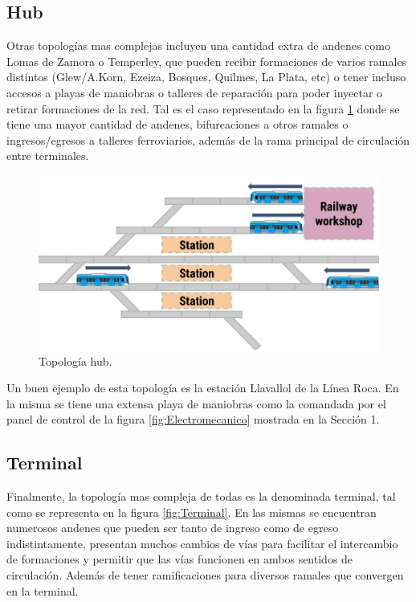 	\subsection{Hub}
	
		Otras topologías mas complejas incluyen una cantidad extra de andenes como Lomas de Zamora o Temperley, que pueden recibir formaciones de varios ramales distintos (Glew/A.Korn, Ezeiza, Bosques, Quilmes, La Plata, etc) o tener incluso accesos a playas de maniobras o talleres de reparación para poder inyectar o retirar formaciones de la red. Tal es el caso representado en la figura \ref{fig:Hub} donde se tiene una mayor cantidad de andenes, bifurcaciones a otros ramales o ingresos/egresos a talleres ferroviarios, además de la rama principal de circulación entre terminales. 
		
			\begin{figure}[h]
			\centering
				\includegraphics[scale=.45]{./Figures/Hub}
				\caption{Topología hub.}
				\label{fig:Hub}
			\end{figure}
	
		Un buen ejemplo de esta topología es la estación Llavallol de la Línea Roca. En la misma se tiene una extensa playa de maniobras como la comandada por el panel de control de la figura \ref{fig:Electromecanico} mostrada en la Sección 1.
		
	\subsection{Terminal}
		
		Finalmente, la topología mas compleja de todas es la denominada terminal, tal como se representa en la figura \ref{fig:Terminal}. En las mismas se encuentran numerosos andenes que pueden ser tanto de ingreso como de egreso indistintamente, presentan muchos cambios de vías para facilitar el intercambio de formaciones y permitir que las vías funcionen en ambos sentidos de circulación. Además de tener ramificaciones para diversos ramales que convergen en la terminal.
		
